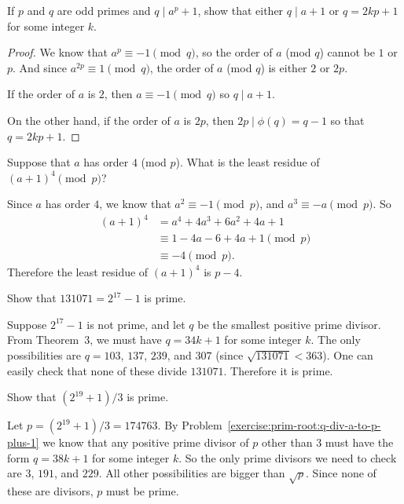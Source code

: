 \label{exercise:prim-root:q-div-a-to-p-plus-1}
If $p$ and $q$ are odd primes and $q\mid a^p + 1$, show that either
$q\mid a + 1$ or $q = 2kp + 1$ for some integer $k$.
\begin{proof}
  We know that $a^p\equiv-1\pmod{q}$, so the order of $a$ (mod $q$)
  cannot be $1$ or $p$. And since $a^{2p}\equiv1\pmod{q}$, the order
  of $a$ (mod $q$) is either $2$ or $2p$.

  If the order of $a$ is $2$, then $a\equiv-1\pmod{q}$ so
  $q\mid a + 1$.

  On the other hand, if the order of $a$ is $2p$, then
  $2p\mid\phi(q) = q - 1$ so that $q = 2kp + 1$.
\end{proof}

 Suppose that $a$ has order $4$ (mod $p$). What is the
least residue of $(a + 1)^4\pmod{p}$?
\begin{solution}
  Since $a$ has order $4$, we know that $a^2\equiv-1\pmod{p}$, and
  $a^3\equiv-a\pmod{p}$. So
  \begin{align*}
    (a + 1)^4
    &= a^4 + 4a^3 + 6a^2 + 4a + 1 \\
    &\equiv 1 - 4a - 6 + 4a + 1 \pmod{p} \\
    &\equiv -4 \pmod{p}.
  \end{align*}
  Therefore the least residue of $(a + 1)^4$ is $p - 4$.
\end{solution}

 Show that $131071 = 2^{17} - 1$ is prime.
\begin{solution}
  Suppose $2^{17} - 1$ is not prime, and let $q$ be the smallest
  positive prime divisor. From Theorem~3, we must have $q = 34k + 1$
  for some integer $k$. The only possibilities are $q = 103$, $137$,
  $239$, and $307$ (since $\sqrt{131071}<363$). One can easily check
  that none of these divide $131071$. Therefore it is prime.
\end{solution}

 Show that $(2^{19} + 1)/3$ is prime.
\begin{solution}
  Let $p = (2^{19} + 1)/3 = 174763$. By
  Problem~\ref{exercise:prim-root:q-div-a-to-p-plus-1} we know that
  any positive prime divisor of $p$ other than $3$ must have the form
  $q = 38k + 1$ for some integer $k$. So the only prime divisors we
  need to check are $3$, $191$, and $229$. All other possibilities are
  bigger than $\sqrt{p}$. Since none of these are divisors, $p$ must
  be prime.
\end{solution}
